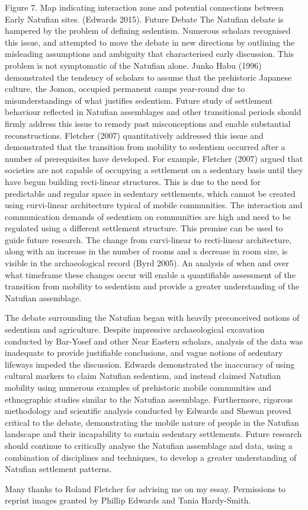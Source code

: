 \documentclass[%
	]{ijsra}
\begin{document}
Figure 7. Map indicating interaction zone and potential connections between Early Natufian sites. (Edwards 2015).
Future Debate
The Natufian debate is hampered by the problem of defining sedentism. Numerous scholars recognised this issue, and attempted to move the debate in new directions by outlining the misleading assumptions and ambiguity that characterised early discussion. This problem is not symptomatic of the Natufian alone. Junko Habu (1996) demonstrated the tendency of scholars to assume that the prehistoric Japanese culture, the Jomon, occupied permanent camps year-round due to misunderstandings of what justifies sedentism. Future study of settlement behaviour reflected in Natufian assemblages and other transitional periods should firmly address this issue to remedy past misconceptions and enable substantial reconstructions. Fletcher (2007) quantitatively addressed this issue and demonstrated that the transition from mobility to sedentism occurred after a number of prerequisites have developed. For example, Fletcher (2007) argued that societies are not capable of occupying a settlement on a sedentary basis until they have begun building recti-linear structures. This is due to the need for predictable and regular space in sedentary settlements, which cannot be created using curvi-linear architecture typical of mobile communities. The interaction and communication demands of sedentism on communities are high and need to be regulated using a different settlement structure. This premise can be used to guide future research. The change from curvi-linear to recti-linear architecture, along with an increase in the number of rooms and a decrease in room size, is visible in the archaeological record (Byrd 2005). An analysis of when and over what timeframe these changes occur will enable a quantifiable assessment of the transition from mobility to sedentism and provide a greater understanding of the Natufian assemblage.

The debate surrounding the Natufian began with heavily preconceived notions of sedentism and agriculture. Despite impressive archaeological excavation conducted by Bar-Yosef and other Near Eastern scholars, analysis of the data was inadequate to provide justifiable conclusions, and vague notions of sedentary lifeways impeded the discussion. Edwards demonstrated the inaccuracy of using cultural markers to claim Natufian sedentism, and instead claimed Natufian mobility using numerous examples of prehistoric mobile communities and ethnographic studies similar to the Natufian assemblage. Furthermore, rigorous methodology and scientific analysis conducted by Edwards and Shewan proved critical to the debate, demonstrating the mobile nature of people in the Natufian landscape and their incapability to sustain sedentary settlements. Future research should continue to critically analyse the Natufian assemblage and data, using a combination of disciplines and techniques, to develop a greater understanding of Natufian settlement patterns.




\IJSRAseparator

Many thanks to Roland Fletcher for advising me on my essay. 
Permissions to reprint images granted by Phillip Edwards and Tania Hardy-Smith.
\IJSRAclosing%
\end{document}
